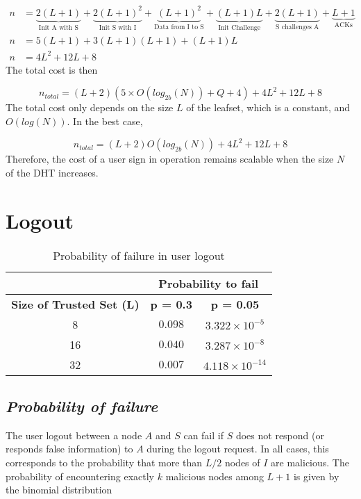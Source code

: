     \begin{align}
      n &= \underbrace{2(L+1)}_\text{Init A with S} +
           \underbrace{2(L+1)^2}_\text{Init S with I} +
           \underbrace{(L+1)^2}_\text{Data from I to S} +
           \underbrace{(L+1)L}_\text{Init Challenge} +
           \underbrace{2(L+1)}_\text{S challenges A} +
           \underbrace{L+1}_\text{ACKs}\\
      n &= 5(L+1) + 3(L+1)(L+1)+ (L+1)L\\
      n &= 4L^2 +12L + 8 
    \end{align}
     The total cost is then

    $$
      n_{total} = (L +2)(5 \times O(log_{2b}(N)) + Q + 4) + 4L^2 +12L + 8 
    $$    
    The total cost only depends on the size $L$ of the leafset, which is a
constant, and $O(log(N))$. In the best case, 

    $$
      n_{total} = (L +2)O(log_{2b}(N)) + 4L^2 +12L + 8 
    $$
    Therefore, the cost of a user sign in operation remains
scalable when the size $N$ of the DHT increases.

\section{Logout}
  \label{sec:eval_logout}
  \begin{table}
    \centering
    \footnotesize
    \begin{tabular}{|c|c|c|}
      \cline{2-3}
      \multicolumn{1}{c|}{}&  \multicolumn{2}{c|}{\textbf{Probability to fail}} \\ \cline{2-3}
      \hline
      \textbf{Size of Trusted Set (L)} & \textbf{p = 0.3} & \textbf{p = 0.05} \\
      \hline \hline
      8 &  $0.098$ & $3.322 \times 10^{-5}$ \\
      \hline
      16 & $0.040$ & $3.287 \times 10^{-8}$  \\
      \hline
      32 & $0.007$ & $4.118 \times 10^{-14}$  \\
      \hline
    \end{tabular}
    \caption{Probability of failure in user logout}
    \label{tab:p_logout}
  \end{table}
  
  \subsection{\textit{Probability of failure}}
    The user logout between a node $A$ and $S$ can fail if $S$ does
not respond (or responds false information) to $A$ during the logout request.
  In all cases, this corresponds to the probability that more than
$L/2$ nodes of $I$ are malicious. The probability of encountering exactly $k$
malicious nodes among $L +1$ is given by the binomial distribution

